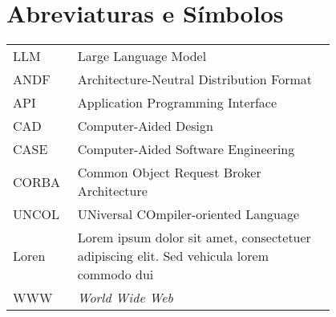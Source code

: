 \chapter*{Abreviaturas e Símbolos}

\begin{flushleft}
\begin{tabular}{l p{0.8\linewidth}}
LLM      & Large Language Model\\
ANDF     & Architecture-Neutral Distribution Format\\
API      & Application Programming Interface\\
CAD      & Computer-Aided Design\\
CASE     & Computer-Aided Software Engineering\\
CORBA    & Common Object Request Broker Architecture\\
UNCOL    & UNiversal COmpiler-oriented Language\\
Loren    & Lorem ipsum dolor sit amet, consectetuer adipiscing
elit. Sed vehicula lorem commodo dui\\
WWW      & \emph{World Wide Web}
\end{tabular}
\end{flushleft}

